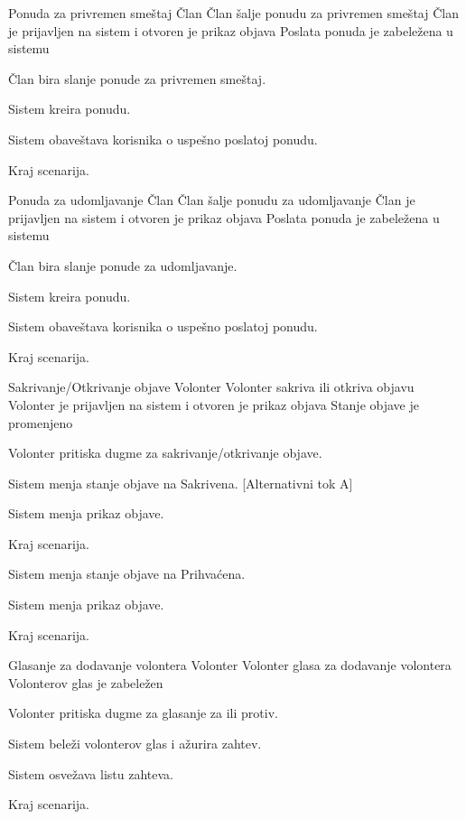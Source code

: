         {Ponuda za privremen smeštaj}
        {Član}
        {Član šalje ponudu za privremen smeštaj}
        {Član je prijavljen na sistem i otvoren je prikaz objava}
        {Poslata ponuda je zabeležena u sistemu}
        {
            \item Član bira slanje ponude za privremen smeštaj.
            \item Sistem kreira ponudu.
            \item Sistem obaveštava korisnika o uspešno poslatoj ponudu.
            \item Kraj scenarija.
        }
        {}
        
        {Ponuda za udomljavanje}
        {Član}
        {Član šalje ponudu za udomljavanje}
        {Član je prijavljen na sistem i otvoren je prikaz objava}
        {Poslata ponuda je zabeležena u sistemu}
        {
            \item Član bira slanje ponude za udomljavanje.
            \item Sistem kreira ponudu.
            \item Sistem obaveštava korisnika o uspešno poslatoj ponudu.
            \item Kraj scenarija.
        }
        {}
        
        {Sakrivanje/Otkrivanje objave}
        {Volonter}
        {Volonter sakriva ili otkriva objavu}
        {Volonter je prijavljen na sistem i otvoren je prikaz objava}
        {Stanje objave je promenjeno}
        {
            \item Volonter pritiska dugme za sakrivanje/otkrivanje objave.
            \item Sistem menja stanje objave na Sakrivena. [Alternativni tok A]
            \item Sistem menja prikaz objave.
            \item Kraj scenarija.
        }
        {
            {
                    \item Sistem menja stanje objave na Prihvaćena.
                    \item Sistem menja prikaz objave.
                    \item Kraj scenarija.
            }
        }
        
        {Glasanje za dodavanje volontera}
        {Volonter}
        {Volonter glasa za dodavanje volontera}
        {}
        {Volonterov glas je zabeležen}
        {
            \item Volonter pritiska dugme za glasanje za ili protiv.
            \item Sistem beleži volonterov glas i ažurira zahtev.
            \item Sistem osvežava listu zahteva.
            \item Kraj scenarija.
        }
        {}
        
